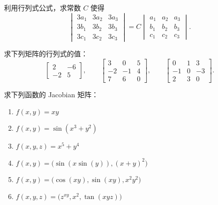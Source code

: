 \begin{question}\label{q:1-39}
利用行列式公式，求常数 $C$ 使得
\[
\begin{vmatrix}3a_1&3a_2&3a_3\\3b_1&3b_2&3b_3\\3c_1&3c_2&3c_3\end{vmatrix}
=C\begin{vmatrix}a_1&a_2&a_3\\b_1&b_2&b_3\\c_1&c_2&c_3\end{vmatrix}.
\]
\end{question}

\begin{question}\label{q:1-40}
求下列矩阵的行列式的值：
\[
\begin{bmatrix}2&-6\\-2&5\end{bmatrix},\qquad
\begin{bmatrix}3&0&5\\-2&-1&4\\7&6&0\end{bmatrix},\qquad
\begin{bmatrix}0&1&3\\-1&0&-3\\2&3&0\end{bmatrix}.
\]
\end{question}

\begin{question}\label{q:1-41}
求下列函数的 Jacobian 矩阵：
\begin{enumerate}
  \item[(a)] $f(x,y)=xy$
  \item[(b)] $f(x,y)=\sin(x^3+y^2)$
  \item[(c)] $f(x,y,z)=x^5+y^4$
  \item[(d)] $f(x,y)=\bigl(\sin(x\sin(y)),(x+y)^2\bigr)$
  \item[(e)] $f(x,y)=\bigl(\cos(xy),\sin(xy),x^2y^2\bigr)$
  \item[(f)] $f(x,y,z)=\bigl(z^{xy},x^2,\tan(xyz)\bigr)$
\end{enumerate}
\end{question}
